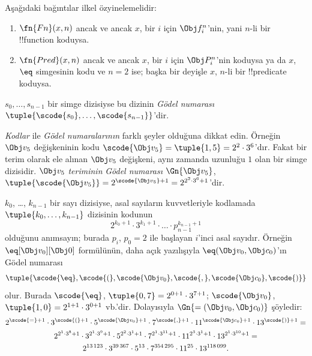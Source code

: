 \documentclass[../../../include/open-logic-section]{subfiles}
\begin{document}
\begin{prop}
Aşağıdaki bağıntılar ilkel özyinelemelidir:
\begin{enumerate}
\item $\fn{Fn}(x, n)$ ancak ve ancak $x$, bir $i$ için $\Obj f^n_i$'nin,
  yani $n$-li bir !!{function} koduysa.
\item $\fn{Pred}(x, n)$ ancak ve ancak $x$, bir $i$ için $\Obj P^n_i$'nin
  koduysa ya da $x$, $\eq$ simgesinin kodu ve $n = 2$ ise; başka bir
  deyişle $x$, $n$-li bir !!{predicate} koduysa.
\end{enumerate}
\end{prop}

\begin{defn}
$s_0, \dots, s_{n-1}$ bir simge dizisiyse bu dizinin \emph{Gödel numarası}
$\tuple{\scode{s_0}, \dots, \scode{s_{n-1}}}$'dir.
\end{defn}

\begin{explain}
\emph{Kodlar} ile \emph{Gödel numaralarının} farklı şeyler olduğuna dikkat
edin. Örneğin $\Obj v_5$ değişkeninin kodu $\scode{\Obj v_5} = \tuple{1, 5}
= 2^2\cdot 3^6$'dır. Fakat bir terim olarak ele alınan $\Obj v_5$ değişkeni,
aynı zamanda uzunluğu $1$ olan bir simge dizisidir. $\Obj v_5$
\emph{teriminin} \emph{Gödel numarası} $\Gn{\Obj v_5}$,
$\tuple{\scode{\Obj v_5}} = 2^{\scode{\Obj v_5} + 1} =
2^{2^2\cdot 3^6 + 1}$'dir.
\end{explain}

\begin{ex}
$k_0$, \dots, $k_{n-1}$ bir sayı dizisiyse, asal sayıların kuvvetleriyle
kodlamada $\tuple{k_0, \dots, k_{n-1}}$ dizisinin kodunun
\[
2^{k_0+1}\cdot3^{k_1+1}\cdot \dots \cdot p_{n-1}^{k_{n-1}+1}
\]
olduğunu anımsayın; burada $p_i$, $p_0=2$ ile başlayan $i$'inci asal
sayıdır. Örneğin $\eq[\Obj v_0][\Obj 0]$ formülünün, daha açık yazılışıyla
${\eq}(\Obj v_0,\Obj c_0)$'ın Gödel numarası
\[
\tuple{\scode{\eq},\scode{(},\scode{\Obj v_0},\scode{,}, \scode{\Obj
    c_0},\scode{)}}
\]
olur. Burada $\scode{\eq}$, $\tuple{0,7} = 2^{0+1}\cdot 3^{7+1}$;
$\scode{\Obj v_0}$, $\tuple{1,0} = 2^{1+1}\cdot3^{0+1}$ vb.'dir.
Dolayısıyla $\Gn{=(\Obj v_0,\Obj c_0)}$ şöyledir:
\begin{multline*}
2^{\scode{=} + 1}\cdot 3^{\scode{(}+1}\cdot 5^{\scode{\Obj v_0}+1}
\cdot 7^{\scode{,} + 1} \cdot 11^{\scode{\Obj c_0}+1} \cdot
13^{\scode{)}+1} = \\
2^{2^1\cdot 3^8 + 1}\cdot 3^{2^1\cdot 3^9+1}\cdot 5^{2^2\cdot 3^1+1}
\cdot 7^{2^1\cdot 3^{11} + 1} \cdot 11^{2^3\cdot3^1+1} \cdot
13^{2^1\cdot3^{10}+1} = \\
2^{13\,123}\cdot 3^{39\,367}\cdot 5^{13}\cdot 7^{354\,295}\cdot11^{25}\cdot13^{118\,099}.
\end{multline*}
\end{ex}
\end{document}
